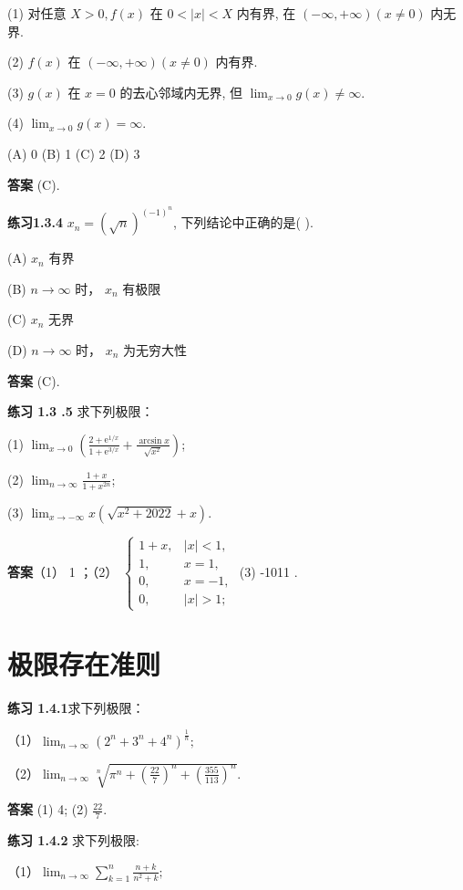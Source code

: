\documentclass[lang=cn,10pt]{elegantbook}
\begin{document}
(1) 对任意 $X>0, f(x)$ 在 $0<|x|<X$ 内有界, 在 $(-\infty,+\infty)(x \neq 0)$ 内无界.

(2) $f(x)$ 在 $(-\infty,+\infty)(x \neq 0)$ 内有界.

(3) $g(x)$ 在 $x=0$ 的去心邻域内无界, 但 $\lim _{x \rightarrow 0} g(x) \neq \infty$.

(4) $\lim _{x \rightarrow 0} g(x)=\infty$.


(A) 0
(B) 1
(C) 2
(D) 3

\textbf{答案} (C).

\textbf{练习1.3.4} $x_n=(\sqrt{n})^{(-1)^n}$, 下列结论中正确的是( ).


(A) $x_n$ 有界

(B) $n \rightarrow \infty$ 时， $x_n$ 有极限

(C) $x_n$ 无界

(D) $n \rightarrow \infty$ 时， $x_n$ 为无穷大性

\textbf{答案} (C).


\textbf{练习 1.3 .5} 求下列极限：


(1) $\lim _{x \rightarrow 0}\left(\frac{2+\mathrm{e}^{1 / x}}{1+\mathrm{e}^{3 / x}}+\frac{\arcsin x}{\sqrt{x^2}}\right)$;

(2) $\lim _{n \rightarrow \infty} \frac{1+x}{1+x^{2 n}}$;

(3) $\lim _{x \rightarrow-\infty} x\left(\sqrt{x^2+2022}+x\right)$.



\textbf{答案}（1） 1 ；（2） $\left\{\begin{array}{cc}1+x, & |x|<1, \\ 1, & x=1, \\ 0, & x=-1, \\ 0, & |x|>1 ;\end{array}\right.$ (3) -1011 .
\section{极限存在准则}
\textbf{练习 1.4.1}求下列极限：

（1）$\lim_{n\rightarrow\infty}\left(2^n+3^n+4^n\right)^{\frac{1}{n}};$

（2）$\lim_{n\rightarrow\infty}\sqrt[n]{\pi^n+\left(\frac{22}{7}\right)^n+\left(\frac{355}{113}\right)^n}.$

\textbf{答案} (1) 4; (2) $\frac{22}{7}$.


\textbf{练习 1.4.2} 求下列极限:


（1）$\lim_{n\rightarrow\infty} \sum_{k=1}^{n} \frac{n+k}{n^2+k};$
\end{document}
